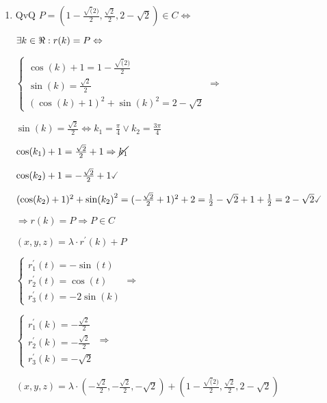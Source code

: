\documentclass[../parcial.tex]{subfiles}
\begin{document}
\begin{enumerate}
        \item QvQ $ P = (1-\frac{\sqrt(2)}{2}, \frac{\sqrt{2}}{2}, 2- \sqrt{2}) \in C \Leftrightarrow$

            $ \exists k \in \real : r(k) = P \Leftrightarrow$

            $\left\{
                \begin{array}{ll}
                    \cos(k) + 1 = 1-\frac{\sqrt(2)}{2}\\
                    \sin(k) = \frac{\sqrt{2}}{2}\\
                    (\cos(k) + 1)^2 + \sin(k)^2 = 2 - \sqrt{2}
                \end{array}
            \right. \Rightarrow$

            $ \sin(k) = \frac{\sqrt{2}}{2} \Leftrightarrow k_1 = \frac{\pi}{4} \vee k_2 = \frac{3\pi}{4}$

            $ \cos(k_1) + 1 = \frac{\sqrt{2}}{2} + 1 \Rightarrow \cancel{k_1} $

            $ \cos(k_2) + 1 = -\frac{\sqrt{2}}{2} + 1 \checked$

            $(\cos(k_2) + 1)^2 + \sin(k_2)^2 = (-\frac{\sqrt{2}}{2} + 1)^2 + 2 = \frac{1}{2} - \sqrt{2} + 1 + \frac{1}{2} = 2 - \sqrt{2} \checked$

            $ \Rightarrow r(k) = P \Rightarrow P \in C $

            $ (x,y,z) = \lambda\cdot r^\prime(k) + P$

            $\left\{
                \begin{array}{ll}
                    r_1^\prime(t) = -\sin(t) \\
                    r_2^\prime(t) = \cos(t) \\
                    r_3^\prime(t) = -2\sin(k)
                \end{array}
            \right. \Rightarrow$

            $\left\{
                \begin{array}{ll}
                    r_1^\prime(k) = -\frac{\sqrt{2}}{2} \\
                    r_2^\prime(k) = -\frac{\sqrt{2}}{2} \\
                    r_3^\prime(k) = -\sqrt{2}
                \end{array}
            \right. \Rightarrow$

            $(x,y,z) = \lambda\cdot(-\frac{\sqrt{2}}{2}, -\frac{\sqrt{2}}{2}, -\sqrt{2}) + (1-\frac{\sqrt(2)}{2}, \frac{\sqrt{2}}{2}, 2- \sqrt{2})$

    \end{enumerate}
\end{document}
